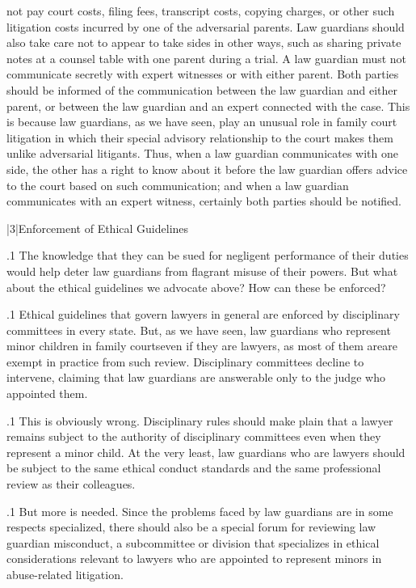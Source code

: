 \documentclass[11pt, twoside]{article}
\begin{document}
{{\begin{docEnumerate}
not pay court costs, filing fees, transcript costs, copying
charges, or other such litigation costs incurred by one of the
adversarial parents. Law guardians should also take care not to
appear to take sides in other ways, such as sharing private notes
at a counsel table with one parent during a trial.
\enumsItem{} A law guardian must not communicate secretly with expert
witnesses or with either parent. Both parties should be
informed of the communication between the law guardian and
either parent, or between the law guardian and an expert
connected with the case. This is because law guardians, as we
have seen, play an unusual role in family court litigation in
which their special advisory relationship to the court makes
them unlike adversarial litigants. Thus, when a law guardian
communicates with one side, the other has a right to know
about it before the law guardian offers advice to the court based
on such communication; and when a law guardian
communicates with an expert witness, certainly both parties
should be notified.

\end{docEnumerate}

}%


\s|3|{Enforcement of Ethical Guidelines}

\p.1{%
\noindent{}The knowledge that they can be sued for negligent performance of their
duties would help deter law guardians from flagrant misuse of their
powers. But what about the ethical guidelines we advocate above?
How can these be enforced?
}%

\p.1{%
Ethical guidelines that govern lawyers in general are enforced by disciplinary committees in every state. But, as we have seen, law guardians
who represent minor children in family courts\mdash{}even if they are lawyers,
as most of them are\mdash{}are exempt in practice from such review. Disciplinary committees decline to intervene, claiming that law guardians
are answerable only to the judge who appointed them.
}%

\p.1{%
This is obviously wrong. Disciplinary rules should make plain that a
lawyer remains subject to the authority of disciplinary committees even
when they represent a minor child. At the very least, law guardians who
are lawyers should be subject to the same ethical conduct standards and
the same professional review as their colleagues.
}%

\p.1{%
But more is needed. Since the problems faced by law guardians
are in some respects specialized, there should also be a special forum
for reviewing law guardian misconduct, a subcommittee or division
that specializes in ethical considerations relevant to lawyers who are
appointed to represent minors in abuse-related litigation.
}%

}
\end{document}
